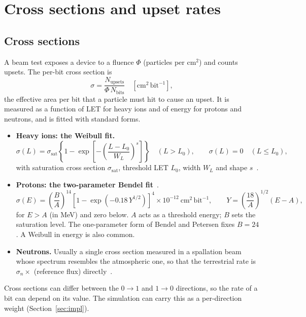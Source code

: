 \documentclass[11pt,a4paper]{article}
\begin{document}
\section{Cross sections and upset rates}
\label{sec:rates}

\subsection{Cross sections}
\label{sec:sigma}

A beam test exposes a device to a fluence $\Phi$ (particles per cm$^2$) and counts upsets. The per-bit cross section is
\begin{equation}
\sigma = \frac{N_{\mathrm{upsets}}}{\Phi\, N_{\mathrm{bits}}} \quad [\mathrm{cm^2\,bit^{-1}}],
\end{equation}
the effective area per bit that a particle must hit to cause an upset. It is measured as a function of LET for heavy ions and of energy for protons and neutrons, and is fitted with standard forms.
\begin{itemize}
  \item \textbf{Heavy ions: the Weibull fit.}
  \begin{equation}
  \sigma(L) = \sigma_{\mathrm{sat}} \left\{ 1 - \exp\left[ -\left( \frac{L - L_0}{W_L} \right)^{s} \right] \right\} \quad (L > L_0), \qquad \sigma(L) = 0 \quad (L \le L_0),
  \label{eq:weibull}
  \end{equation}
  with saturation cross section $\sigma_{\mathrm{sat}}$, threshold LET $L_0$, width $W_L$ and shape $s$~\cite{petersen2011}.
  \item \textbf{Protons: the two-parameter Bendel fit}~\cite{stapor1990,bendel1983}.
  \begin{equation}
  \sigma(E) = \left( \frac{B}{A} \right)^{14} \left[ 1 - \exp\left( -0.18\, Y^{1/2} \right) \right]^{4} \times 10^{-12}~\mathrm{cm^2\,bit^{-1}}, \qquad Y = \left( \frac{18}{A} \right)^{1/2} (E - A),
  \label{eq:bendel}
  \end{equation}
  for $E > A$ (in MeV) and zero below. $A$ acts as a threshold energy; $B$ sets the saturation level. The one-parameter form of Bendel and Petersen fixes $B = 24$. A Weibull in energy is also common.
  \item \textbf{Neutrons.} Usually a single cross section measured in a spallation beam whose spectrum resembles the atmospheric one, so that the terrestrial rate is $\sigma_n \times$ (reference flux) directly~\cite{jesd89a}.
\end{itemize}
Cross sections can differ between the $0\to1$ and $1\to0$ directions, so the rate of a bit can depend on its value. The simulation can carry this as a per-direction weight (Section~\ref{sec:impl}).
\end{document}
